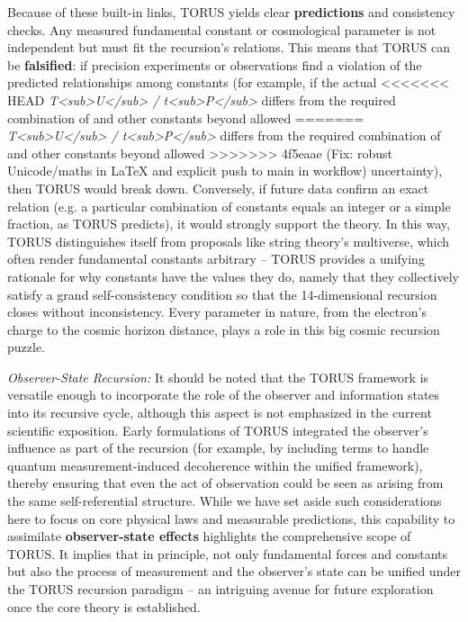 \documentclass[]{article}
\begin{document}
Because of these built-in links, TORUS yields clear \textbf{predictions}
and consistency checks. Any measured fundamental constant or
cosmological parameter is not independent but must fit the recursion's
relations. This means that TORUS can be \textbf{falsified}: if precision
experiments or observations find a violation of the predicted
relationships among constants (for example, if the actual
<<<<<<< HEAD
\emph{T\textless sub\textgreater U\textless/sub\textgreater{} /
t\textless sub\textgreater P\textless/sub\textgreater{}} differs from
the required combination of \alpha and other constants beyond allowed
=======
\emph{T\textless{}sub\textgreater{}U\textless{}/sub\textgreater{} /
t\textless{}sub\textgreater{}P\textless{}/sub\textgreater{}} differs
from the required combination of \alpha and other constants beyond allowed
>>>>>>> 4f5eaae (Fix: robust Unicode/maths in LaTeX and explicit push to main in workflow)
uncertainty), then TORUS would break down. Conversely, if future data
confirm an exact relation (e.g. a particular combination of constants
equals an integer or a simple fraction, as TORUS predicts), it would
strongly support the theory. In this way, TORUS distinguishes itself
from proposals like string theory's multiverse, which often render
fundamental constants arbitrary -- TORUS provides a unifying rationale
for why constants have the values they do, namely that they collectively
satisfy a grand self-consistency condition so that the 14-dimensional
recursion closes without inconsistency. Every parameter in nature, from
the electron's charge to the cosmic horizon distance, plays a role in
this big cosmic recursion puzzle.

\emph{Observer-State Recursion:} It should be noted that the TORUS
framework is versatile enough to incorporate the role of the observer
and information states into its recursive cycle, although this aspect is
not emphasized in the current scientific exposition. Early formulations
of TORUS integrated the observer's influence as part of the recursion
(for example, by including terms to handle quantum measurement-induced
decoherence within the unified framework), thereby ensuring that even
the act of observation could be seen as arising from the same
self-referential structure. While we have set aside such considerations
here to focus on core physical laws and measurable predictions, this
capability to assimilate \textbf{observer-state effects} highlights the
comprehensive scope of TORUS. It implies that in principle, not only
fundamental forces and constants but also the process of measurement and
the observer's state can be unified under the TORUS recursion paradigm
-- an intriguing avenue for future exploration once the core theory is
established.
\end{document}

